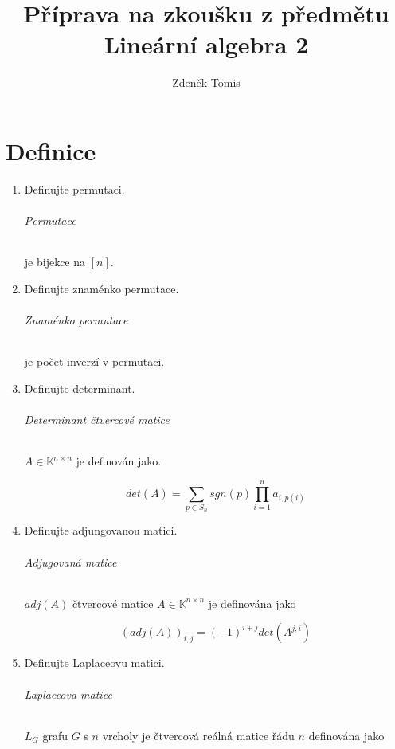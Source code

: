 \documentclass[10pt,a4paper]{article}
\title{Příprava na zkoušku z předmětu Lineární algebra 2}
\author{Zdeněk Tomis}
\date{}
\theoremstyle{plain}
\theoremstyle{definition}
\begin{document}
\maketitle

\part{Definice}

\begin{enumerate}

\item Definujte permutaci.

\paragraph{Permutace} je bijekce na $[n]$.

\item Definujte znaménko permutace.

\paragraph{Znaménko permutace} je počet inverzí v permutaci.

\item Definujte determinant.

\paragraph{Determinant čtvercové matice} $A \in \mathbb{K}^{n \times n}$ je definován jako.

\[ det(A) = \sum_{p \in S_n} sgn(p) \prod^n_{i = 1} a_{i, p(i)} \]

\item Definujte adjungovanou matici.

\paragraph{Adjugovaná matice} $adj(A)$ čtvercové matice  $A \in \mathbb{K}^{n \times n}$ je definována jako

\[ (adj(A))_{i,j} = (-1)^{i+j} det(A^{j,i})\]
\item Definujte Laplaceovu matici.

\paragraph{Laplaceova matice} $L_G$ grafu $G$ s $n$ vrcholy je čtvercová reálná matice řádu $n$ definována jako


\end{enumerate}
\end{document}
